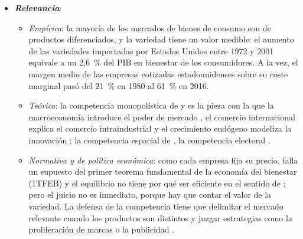 \documentclass[11pt]{article}
\begin{document}
\begin{itemize}
\item \textbf{\emph{Relevancia}}:
  \begin{itemize}
  \item \emph{Empírica}: la mayoría de los mercados de bienes de consumo son de productos diferenciados, y la variedad tiene un valor medible: el aumento de las variedades importadas por Estados Unidos entre 1972 y 2001 equivale a un 2,6~\% del PIB en bienestar de los consumidores\nocite{BrodaWeinstein2006Globalization}. A la vez, el margen medio de las empresas cotizadas estadounidenses sobre su coste marginal pasó del 21~\% en 1980 al 61~\% en 2016\nocite{DeLoeckerEeckhoutUnger2020Rise}.
  \item \emph{Teórica}: la competencia monopolística de  y  es la pieza con la que la macroeconomía introduce el poder de mercado , el comercio internacional explica el comercio intraindustrial  y el crecimiento endógeno modeliza la innovación ; la competencia espacial de , la competencia electoral .
  \item \emph{Normativa y de política económica}: como cada empresa fija su precio, falla un supuesto del primer teorema fundamental de la economía del bienestar (1TFEB) y el equilibrio no tiene por qué ser eficiente en el sentido de  ; pero el juicio no es inmediato, porque hay que contar el valor de la variedad. La defensa de la competencia tiene que delimitar el mercado relevante cuando los productos son distintos  y juzgar estrategias como la proliferación de marcas o la publicidad  .
  \end{itemize}


\end{itemize}
\end{document}
